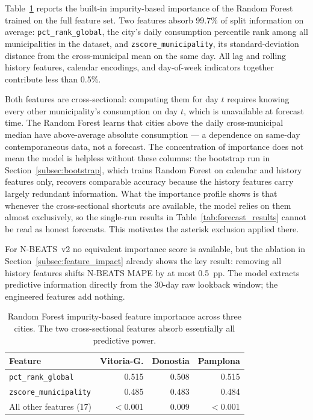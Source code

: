﻿\documentclass[12pt,reqno, twoside]{amsbook}
\numberwithin{figure}{chapter}
\numberwithin{table}{chapter}
\numberwithin{equation}{chapter}
\theoremstyle{plain}
\numberwithin{equation}{chapter}
\numberwithin{section}{chapter}
\begin{document}
Table~\ref{tab:rf_importance} reports the built-in impurity-based importance of the Random Forest trained on the full feature set. Two features absorb 99.7\% of split information on average: \texttt{pct\_rank\_global}, the city's daily consumption percentile rank among all municipalities in the dataset, and \texttt{zscore\_municipality}, its standard-deviation distance from the cross-municipal mean on the same day. All lag and rolling history features, calendar encodings, and day-of-week indicators together contribute less than 0.5\%.

Both features are cross-sectional: computing them for day $t$ requires knowing every other municipality's consumption on day $t$, which is unavailable at forecast time. The Random Forest learns that cities above the daily cross-municipal median have above-average absolute consumption --- a dependence on same-day contemporaneous data, not a forecast. The concentration of importance does not mean the model is helpless without these columns: the bootstrap run in Section~\ref{subsec:bootstrap}, which trains Random Forest on calendar and history features only, recovers comparable accuracy because the history features carry largely redundant information. What the importance profile shows is that whenever the cross-sectional shortcuts are available, the model relies on them almost exclusively, so the single-run results in Table~\ref{tab:forecast_results} cannot be read as honest forecasts. This motivates the asterisk exclusion applied there.

For N-BEATS~v2 no equivalent importance score is available, but the ablation in Section~\ref{subsec:feature_impact} already shows the key result: removing all history features shifts N-BEATS \ac{MAPE} by at most 0.5~pp. The model extracts predictive information directly from the 30-day raw lookback window; the engineered features add nothing.

\begin{table}[htbp]
\centering
\caption{Random Forest impurity-based feature importance across three cities. The two cross-sectional features absorb essentially all predictive power.}
\label{tab:rf_importance}
\begin{tabular}{lrrr}
\toprule
\textbf{Feature} & \textbf{Vitoria-G.} & \textbf{Donostia} & \textbf{Pamplona} \\
\midrule
\texttt{pct\_rank\_global}    & 0.515 & 0.508 & 0.515 \\
\texttt{zscore\_municipality} & 0.485 & 0.483 & 0.484 \\
All other features (17)       & $<$0.001 & 0.009 & $<$0.001 \\
\bottomrule
\end{tabular}
\end{table}
\end{document}
